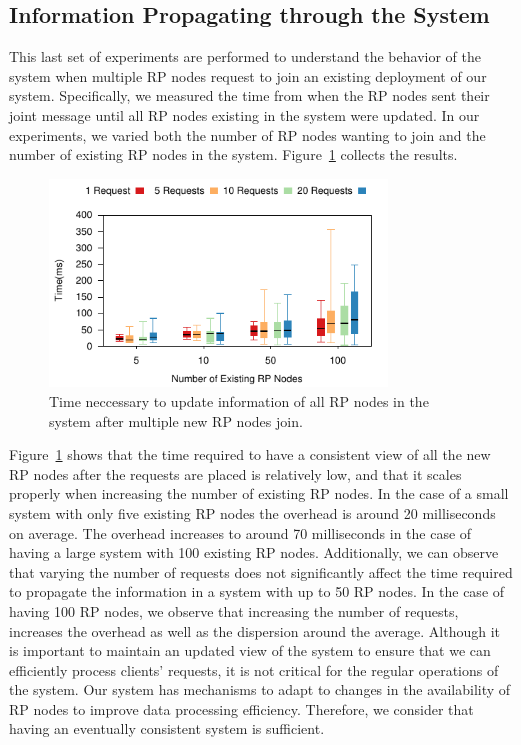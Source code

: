 \subsection{Information Propagating through the System}

This last set of experiments are performed to understand the behavior of the system when multiple RP nodes request to join an existing deployment of our system. Specifically, we measured the time from when the RP nodes sent their joint message until all RP nodes existing in the system were updated. In our experiments, we varied both the number of RP nodes wanting to join and the number of existing RP nodes in the system. Figure~\ref{fig:rpDiscovery} collects the results.

\begin{figure}[htb!]
  \centering
    \includegraphics[width=0.8\textwidth]{Figures/rpDiscoveryBox.pdf}
  \caption{Time neccessary to update information of all RP nodes in the system after multiple new RP nodes join.} \label{fig:rpDiscovery}
\end{figure}

Figure~\ref{fig:rpDiscovery} shows that the time required to have a consistent view of all the new RP nodes after the requests are placed is relatively low, and that it scales properly when increasing the number of existing RP nodes. In the case of a small system with only five existing RP nodes the overhead is around 20 milliseconds on average. The overhead increases to around 70 milliseconds in the case of having a large system with 100 existing RP nodes. Additionally, we can observe that varying the number of requests does not significantly affect the time required to propagate the information in a system with up to 50 RP nodes. In the case of having 100 RP nodes, we observe that increasing the number of requests, increases the overhead as well as the dispersion around the average. Although it is important to maintain an updated view of the system to ensure that we can efficiently process clients' requests, it is not critical for the regular operations of the system. Our system has mechanisms to adapt to changes in the availability of RP nodes to improve data processing efficiency. Therefore, we consider that having an eventually consistent system is sufficient. 



